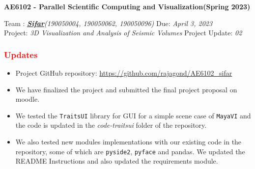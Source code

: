 \documentclass[11pt,a4paper]{article}
\newcommand{\student}{\textbf{\textit{\href{https://github.com/rajagond/AE6102_sifar}{Sifar}}}}
\begin{document}
\noindent\fbox
{
\begin{minipage}{\dimexpr\textwidth-2\fboxsep-2\fboxrule\relax}
\vspace{0.5cm}
\begin{center}
    

	{\bf\Large AE6102 - Parallel Scientific Computing and Visualization(Spring 2023)}\\
        \vspace*{0.2cm}
\end{center}
\noindent

Team   : \student \textit{(190050004, 190050062, 190050096)} \hfill Due: \textit{April 3, 2023}\\[0.1cm]
Project: \textit{3D Visualization and Analysis of Seismic Volumes} \hfill Project Update: \textit{02}
 \vspace*{0.2cm}       
\end{minipage}
}


\subsubsection*{\textcolor{red}{Updates}}
\begin{itemize}
    \item Project GitHub repository: \url{https://github.com/rajagond/AE6102_sifar}
    \item We have finalized the project and submitted the final project proposal on moodle.
    \item We tested the \verb!TraitsUI! library for GUI for a simple scene case of \verb|MayaVI| and the code is updated in the \textit{code-traitsui} folder of the repository.
    
    \item We also tested new modules implementations with our existing code in the repository, some of which are \verb!pyside2!, \verb|pyface| and pandas. We updated the README Instructions and also updated the requirements module.
\end{itemize}
\end{document}
